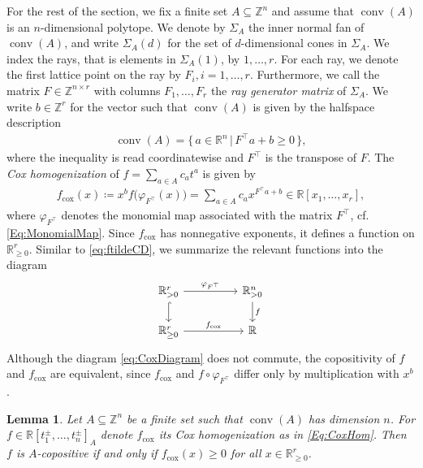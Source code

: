 \documentclass[a4paper,11pt]{amsart}
\newtheorem{lemma}[theorem]{Lemma}
\theoremstyle{definition}
\DeclareMathOperator{\conv}{conv}
\newcommand{\ZZ}{\mathbb{Z}}
\newcommand{\RR}{\mathbb{R}}
\newcommand{\cox}{\mathrm{cox}}
\begin{document}
For the rest of the section, we fix a finite set $A \subseteq \mathbb{Z}^n$ and assume that $\conv(A)$ is an $n$-dimensional polytope.
We denote by $\Sigma_A$ the inner normal fan of $\conv(A)$, and write $\Sigma_A(d)$ for the set of $d$-dimensional cones in $\Sigma_A$.
We index the rays, that is elements in $\Sigma_A(1)$, by $1,\dots,r$. For each ray, we denote the first lattice point on the ray by $F_i, i=1,\dots, r$.
Furthermore, we call the matrix $F\in \ZZ^{n\times r}$ with columns $F_1, \dots, F_r$ the \emph{ray generator matrix} of $\Sigma_A$. We write $b \in \ZZ^r$ for the vector such that $\conv(A)$ is given by the halfspace description
\begin{align}
\label{Eq:FacetDescr}
    \conv(A) =\{\, a \in \RR^n \,|\, F^\top a+b\geq 0\,\},
\end{align}
where the inequality is read coordinatewise and $F^\top$ is the transpose of $F$. The \emph{Cox homogenization} of $f = \sum_{a \in A}c_at^a$ is given by
\begin{align}
\label{Eq:CoxHom}
    f_\cox(x)\coloneqq x^b f\big(\varphi_{F^\top}(x)\big) = \sum_{a\in A}c_a x^{F^\top a+b}\in \RR[x_1,\dots,x_r],
\end{align}
where $\varphi_{F^\top}$ denotes the monomial map associated with the matrix $F^\top$, cf. \eqref{Eq:MonomialMap}.
Since $f_{\mathrm{cox}}$ has nonnegative exponents, it defines a function on $\mathbb{R}^r_{\geq0}$.
Similar to \eqref{eq:ftildeCD}, we summarize the relevant functions into the diagram 
       \begin{equation}
     \label{eq:CoxDiagram}
                  \begin{tikzcd}
\RR_{>0}^r\arrow[rr,"\varphi_{F^\top}"]\arrow[d,hookrightarrow] & & \RR^n_{>0}\arrow[d,"f"] \\
           \RR^r_{\geq0} \arrow[rr,"f_{\cox}"]  & & \RR
         \end{tikzcd}
     \end{equation}
Although the diagram \eqref{eq:CoxDiagram} does not commute, the copositivity of $f$ and $f_\cox$ are equivalent, since $f_\cox$ and $f \circ \varphi_{F^\top}$ differ only by multiplication with $x^b$.
\begin{lemma}
\label{Lemma:CoxSparseCopisitive}
Let $A \subseteq \mathbb{Z}^n$ be a finite set such that $\conv(A)$ has dimension $n$. For $f \in \RR[t_1^\pm , \dots, t_n^\pm]_A$ denote $f_{\cox}$ its Cox homogenization as in \eqref{Eq:CoxHom}. Then $f$ is $A$-copositive if and only if $f_\cox(x) \geq 0$ for all $x \in \mathbb{R}^r_{\geq0}$. 
\end{lemma}
\end{document}
